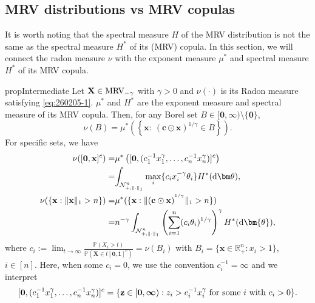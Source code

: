 \documentclass[12pt]{article}
\theoremstyle{plain}
\theoremstyle{plain}
\theoremstyle{definition}
\renewcommand{\Pr}{\mathbb{P}}
\newcommand{\R}{\mathbb{R}}
\newcommand{\punitsphereone}[1]{\mathcal{N}_{+,\|\cdot\|_1}^{#1}}
\begin{document}
\subsection{MRV distributions vs MRV copulas}
It is worth noting that the spectral measure $H$ of the MRV distribution is not the same as the spectral measure $H^*$ of its (MRV) copula. In this section, we will connect the radon measure $\nu$ with the exponent measure $\mu^*$ and spectral measure $H^*$ of its MRV copula.

\begin{restatable}{prop}{Intermediate}
	\label{prop:measure-equation}
	Let ${\bf X}\in {\rm MRV}_{-\gamma}$ with $\gamma>0$ and $\nu(\cdot)$ is its Radon measure satisfying \eqref{eq:260205-1}. $\mu^*$ and $H^*$ are the exponent measure and spectral measure of its MRV copula. Then, for any Borel set $B\in[\mathbf{0},\bm{\infty})\setminus\{\mathbf{0}\}$, 
	\begin{equation}
		\label{eq:measure-equation}
		\nu(B) = \mu^*\left(\left\{\mathbf{x}:~\left(\mathbf{c}\odot\mathbf{x}\right)^{1/\gamma}\in B\right\}\right).
	\end{equation} 
	For specific sets,  we have
	\begin{align}
		\nu([\mathbf 0,{\bf x}]^c)
		=&\mu^*\left([\mathbf 0,(c_1^{-1}x_1^\gamma,\dots,c_n^{-1}x_n^\gamma)]^c\right)\notag\\
		=&{  \int_{\punitsphereone{n}} \max_i \{ c_ix_i ^{-\gamma} \theta_i\} H^*(\mathrm{d}{\bm\theta})},\label{eq:cube}\\
		\nu(\{\mathbf{x}: \|\mathbf{x}\|_1>n \})
		=&\mu^*( \{ \mathbf{x}: \|( {\mathbf c}\odot \mathbf{x})^{^{1/\gamma}}\|_1>n\})\notag\\
		=& n^{-\gamma}\int_{\punitsphereone{n}}
		\left(\sum_{i=1}^n(c_i{\theta}_i)^{1/\gamma}\right)^\gamma H^*(\mathrm{d}\bm{\theta}),\label{eq:ball}
	\end{align}
	where  $c_i := \lim_{t\to\infty}\frac{\Pr\left(X_i>t\right)}{\Pr\left(\mathbf X\in t[\mathbf 0,\mathbf 1]^c\right)}
	=\nu(B_i)$ with $B_i=\{\mathbf{x}\in\R_+^n:x_i>1\}$, $i\in [n]$. Here, when some \(c_i=0\), we use the convention \(c_i^{-1}=\infty\) and   we interpret
	\[
	[\mathbf 0,(c_1^{-1}x_1^\gamma,\dots,c_n^{-1}x_n^\gamma)]^c
	=
	\{{\bf z}\in[{\bf 0},\boldsymbol{\infty}): z_i>c_i^{-1}x_i^\gamma
	\text{ for some } i \text{ with } c_i>0\}.
	\]
\end{restatable}
\end{document}
